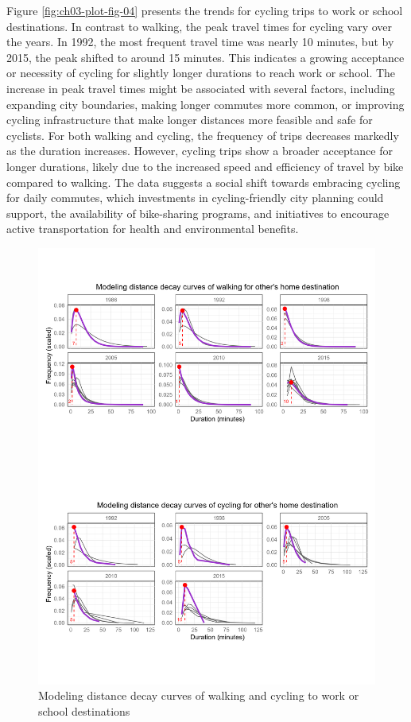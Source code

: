 \documentclass[
11pt, %
oneside, %
english, %
singlespacing, %
]{macthesis} %
\begin{document}
Figure \ref{fig:ch03-plot-fig-04} presents the trends for cycling trips to work or school destinations. In contrast to walking, the peak travel times for cycling vary over the years. In 1992, the most frequent travel time was nearly 10 minutes, but by 2015, the peak shifted to around 15 minutes. This indicates a growing acceptance or necessity of cycling for slightly longer durations to reach work or school. The increase in peak travel times might be associated with several factors, including expanding city boundaries, making longer commutes more common, or improving cycling infrastructure that make longer distances more feasible and safe for cyclists. For both walking and cycling, the frequency of trips decreases markedly as the duration increases. However, cycling trips show a broader acceptance for longer durations, likely due to the increased speed and efficiency of travel by bike compared to walking. The data suggests a social shift towards embracing cycling for daily commutes, which investments in cycling-friendly city planning could support, the availability of bike-sharing programs, and initiatives to encourage active transportation for health and environmental benefits.

\begin{figure}

{\centering \includegraphics[width=1\linewidth]{figure/ch03_fig_05} 

}

\caption{Modeling distance decay curves of walking and cycling to work or school destinations}\label{fig:ch03-plot-fig-05}
\end{figure}
\end{document}

